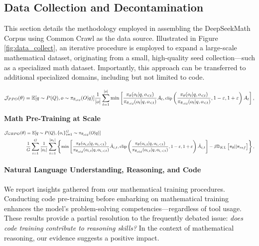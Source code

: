 {\subsection{Data Collection and Decontamination} 
This section details the methodology employed in assembling the DeepSeekMath Corpus using Common Crawl as the data source. Illustrated in Figure \ref{fig:data_collect}, an iterative procedure is employed to expand a large-scale mathematical dataset, originating from a small, high-quality seed collection—such as a specialized math dataset. Importantly, this approach can be transferred to additional specialized domains, including but not limited to code.

\begin{equation}
\footnotesize
                \mathcal{J}_{PPO}(\theta) = \mathbb{E}{[q \sim P(Q), o \sim \pi_{\theta_{old}}(O|q)]} \frac{1}{|o|} \sum_{t=1}^{|o|} \min \left[ \frac{\pi_\theta(o_{t} | q, o_{<t})}{\pi_{\theta_{old}}(o_{t} | q, o_{<t})} A_{t}, \text{clip} \left( \frac{\pi_\theta(o_{t} | q, o_{<t})}{\pi_{\theta_{old}}(o_{t} | q, o_{<t})}, 1 - \varepsilon, 1 + \varepsilon \right)  A_{t} \right] ,
\end{equation}

\textbf{Math Pre-Training at Scale}

\begin{equation}
\footnotesize
\begin{split}
    \mathcal{J}_{GRPO}(\theta) &= \mathbb{E}{[q \sim P(Q), \{o_i\}_{i=1}^G \sim \pi_{\theta_{old}}(O|q)]}  \\
    & \frac{1}{G}\sum_{i=1}^G\frac{1}{|o_i|} \sum_{t=1}^{|o_i|} \left\{ \min \left[ \frac{\pi_\theta(o_{i,t} | q, o_{i,<t})}{\pi_{\theta_{old}}(o_{i,t} | q, o_{i,<t})} \hat{A}_{i,t}, \text{clip} \left( \frac{\pi_\theta(o_{i,t} | q, o_{i,<t})}{\pi_{\theta_{old}}(o_{i,t} | q, o_{i,<t})}, 1 - \varepsilon, 1 + \varepsilon \right)  \hat{A}_{i,t} \right] - \beta \mathbb{D}_{KL}\left[\pi_{\theta} || \pi_{ref}\right]\right\} ,
\end{split}
\label{eq:GRPO-obj}
\end{equation}

\paragraph{Natural Language Understanding, Reasoning, and Code}

    \item We report insights gathered from our mathematical training procedures. Conducting code pre-training before embarking on mathematical training enhances the model's problem-solving competencies—regardless of tool usage. These results provide a partial resolution to the frequently debated issue: \textit{does code training contribute to reasoning skills?} In the context of mathematical reasoning, our evidence suggests a positive impact.

}
